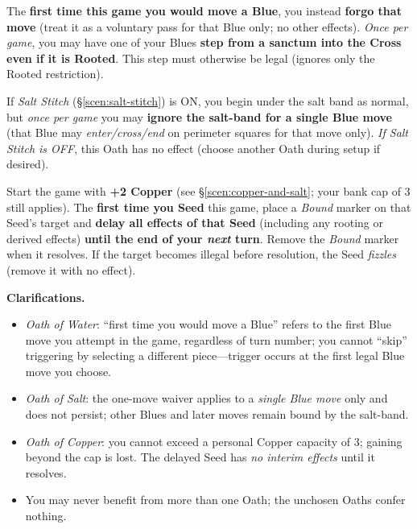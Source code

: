 \documentclass[11pt]{article}
\numberwithin{equation}{section} %
\theoremstyle{plain} %
\theoremstyle{definition} %
\theoremstyle{remark} %
\begin{document}
\begin{description}\setlength\itemsep{0.35em}
  \item[\textit{Oath of Water.}] The \textbf{first time this game you would move a Blue}, you instead \textbf{forgo that move} (treat it as a voluntary pass for that Blue only; no other effects). \emph{Once per game}, you may have one of your Blues \textbf{step from a sanctum into the Cross even if it is Rooted}. This step must otherwise be legal (ignores only the Rooted restriction).

  \item[\textit{Oath of Salt.}] If \emph{Salt Stitch} (\S\ref{scen:salt-stitch}) is \textsc{ON}, you begin under the salt band as normal, but \emph{once per game} you may \textbf{ignore the salt-band for a single Blue move} (that Blue may \emph{enter/cross/end} on perimeter squares for that move only). \emph{If Salt Stitch is \textsc{OFF}}, this Oath has no effect (choose another Oath during setup if desired).

  \item[\textit{Oath of Copper.}] Start the game with \textbf{+2 Copper} (see \S\ref{scen:copper-and-salt}; your bank cap of 3 still applies). The \textbf{first time you Seed} this game, place a \emph{Bound} marker on that Seed’s target and \textbf{delay all effects of that Seed} (including any rooting or derived effects) \textbf{until the end of your \emph{next} turn}. Remove the \emph{Bound} marker when it resolves. If the target becomes illegal before resolution, the Seed \emph{fizzles} (remove it with no effect).
\end{description}

\medskip
\noindent\textbf{Clarifications.}
\begin{itemize}\setlength\itemsep{0.25em}
  \item \textit{Oath of Water}: “first time you would move a Blue” refers to the first Blue move you attempt in the game, regardless of turn number; you cannot “skip” triggering by selecting a different piece—trigger occurs at the first legal Blue move you choose.
  \item \textit{Oath of Salt}: the one-move waiver applies to a \emph{single Blue move} only and does not persist; other Blues and later moves remain bound by the salt-band.
  \item \textit{Oath of Copper}: you cannot exceed a personal Copper capacity of 3; gaining beyond the cap is lost. The delayed Seed has \emph{no interim effects} until it resolves.
  \item You may never benefit from more than one Oath; the unchosen Oaths confer nothing.
\end{itemize}
\end{document}
